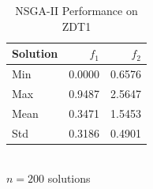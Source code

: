 \begin{table}[htbp]
\centering
\caption{NSGA-II Performance on ZDT1}
\label{tab:zdt1_nsgaii}
\begin{tabular}{lrr}
\toprule
Solution & $f_{1}$ & $f_{2}$ \\
\midrule
Min & 0.0000 & 0.6576 \\
Max & 0.9487 & 2.5647 \\
Mean & 0.3471 & 1.5453 \\
Std & 0.3186 & 0.4901 \\
\bottomrule
\end{tabular}
\\[0.5em]
\footnotesize{$n = 200$ solutions}
\end{table}